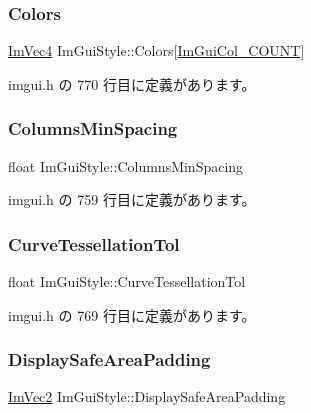 \subsubsection{\texorpdfstring{Colors}{Colors}}
{\footnotesize\ttfamily \mbox{\hyperlink{struct_im_vec4}{Im\+Vec4}} Im\+Gui\+Style\+::\+Colors\mbox{[}\mbox{\hyperlink{imgui_8h_a8e46ef7d0c76fbb1916171edfa4ae9e7ac911e17bec14cc3339cf3901a197628b}{Im\+Gui\+Col\+\_\+\+C\+O\+U\+NT}}\mbox{]}}



 imgui.\+h の 770 行目に定義があります。

\mbox{\label{struct_im_gui_style_a8fed04481e1d75bb95c97819f545e2ba}} 
\subsubsection{\texorpdfstring{Columns\+Min\+Spacing}{ColumnsMinSpacing}}
{\footnotesize\ttfamily float Im\+Gui\+Style\+::\+Columns\+Min\+Spacing}



 imgui.\+h の 759 行目に定義があります。

\mbox{\label{struct_im_gui_style_a41eb9377b63b8b85ab807c28e00198e9}} 
\subsubsection{\texorpdfstring{Curve\+Tessellation\+Tol}{CurveTessellationTol}}
{\footnotesize\ttfamily float Im\+Gui\+Style\+::\+Curve\+Tessellation\+Tol}



 imgui.\+h の 769 行目に定義があります。

\mbox{\label{struct_im_gui_style_a8dd02a6a031ec8667e76aab1e28755bd}} 
\subsubsection{\texorpdfstring{Display\+Safe\+Area\+Padding}{DisplaySafeAreaPadding}}
{\footnotesize\ttfamily \mbox{\hyperlink{struct_im_vec2}{Im\+Vec2}} Im\+Gui\+Style\+::\+Display\+Safe\+Area\+Padding}



